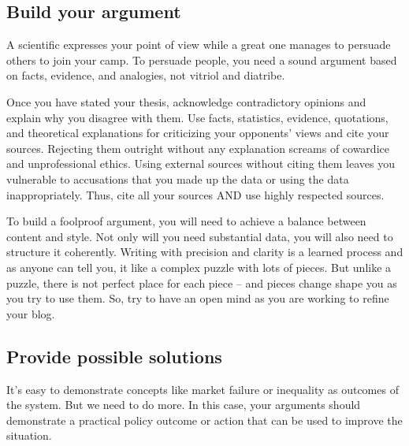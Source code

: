 \documentclass{tufte-handout}\usepackage[]{graphicx}\usepackage[]{color}
\newenvironment{enumerate*}%
  {\begin{enumerate}%
    \setlength{\itemsep}{0pt}%
    \setlength{\parskip}{0pt}}%
  {\end{enumerate}}
\begin{document}
\subsection{Build your argument}

A scientific expresses your point of view while a great one manages to persuade others to join your camp. To persuade people, you need a sound argument based on facts, evidence, and analogies, not vitriol and diatribe. 

Once you have stated your thesis, acknowledge contradictory opinions and explain why you disagree with them. Use facts, statistics, evidence, quotations, and theoretical explanations for criticizing your opponents' views and cite your sources. Rejecting them outright without any explanation screams of cowardice and unprofessional ethics. Using external sources without citing them leaves you vulnerable to accusations that you made up the data or using the data inappropriately. Thus, cite all your sources AND use highly respected sources.

To build a foolproof argument, you will need to achieve a balance between content and style. Not only will you need substantial data, you will also need to structure it coherently. Writing with precision and clarity is a learned process and as anyone can tell you, it like a complex puzzle with lots of pieces. But unlike a puzzle, there is not perfect place for each piece -- and pieces change shape you as you try to use them. So, try to have an open mind as you are working to refine your blog. 




\subsection{Provide possible solutions}

It's easy to demonstrate concepts like market failure or inequality as outcomes of the system. But we need to do more. In this case, your arguments should demonstrate a practical policy outcome or action that can be used to improve the situation. 


\end{document}
